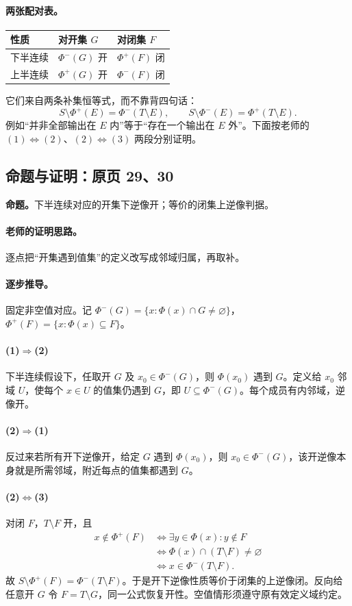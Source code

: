 \paragraph{两张配对表。}
\begin{center}\begin{tabular}{lll}\toprule
性质&对开集 $G$&对闭集 $F$\\\midrule
下半连续&$\Phi^-(G)$ 开&$\Phi^+(F)$ 闭\\
上半连续&$\Phi^+(G)$ 开&$\Phi^-(F)$ 闭\\\bottomrule\end{tabular}\end{center}
它们来自两条补集恒等式，而不靠背四句话：
\[S\setminus\Phi^+(E)=\Phi^-(T\setminus E),\qquad
S\setminus\Phi^-(E)=\Phi^+(T\setminus E).\]
例如“并非全部输出在 $E$ 内”等于“存在一个输出在 $E$ 外”。下面按老师的 $(1)\Leftrightarrow(2)$、$(2)\Leftrightarrow(3)$ 两段分别证明。


\subsection{命题与证明：原页 29、30}

\textbf{命题。}下半连续对应的开集下逆像开；等价的闭集上逆像判据。

\paragraph{老师的证明思路。}逐点把“开集遇到值集”的定义改写成邻域归属，再取补。

\paragraph{逐步推导。}
固定非空值对应。记 $\Phi^-(G)=\{x:\Phi(x)\cap G\ne\varnothing\}$，$\Phi^+(F)=\{x:\Phi(x)\subseteq F\}$。
\paragraph{(1)$\Rightarrow$(2)}下半连续假设下，任取开 $G$ 及 $x_0\in\Phi^-(G)$，则 $\Phi(x_0)$ 遇到 $G$。定义给 $x_0$ 邻域 $U$，使每个 $x\in U$ 的值集仍遇到 $G$，即 $U\subseteq\Phi^-(G)$。每个成员有内邻域，逆像开。
\paragraph{(2)$\Rightarrow$(1)}反过来若所有开下逆像开，给定 $G$ 遇到 $\Phi(x_0)$，则 $x_0\in\Phi^-(G)$，该开逆像本身就是所需邻域，附近每点的值集都遇到 $G$。
\paragraph{(2)$\Leftrightarrow$(3)}对闭 $F$，$T\setminus F$ 开，且
\begin{align*}
x\notin\Phi^+(F)&\iff\exists y\in\Phi(x):y\notin F\\
&\iff\Phi(x)\cap(T\setminus F)\ne\varnothing\\
&\iff x\in\Phi^-(T\setminus F).
\end{align*}
故 $S\setminus\Phi^+(F)=\Phi^-(T\setminus F)$。于是开下逆像性质等价于闭集的上逆像闭。反向给任意开 $G$ 令 $F=T\setminus G$，同一公式恢复开性。空值情形须遵守原有效定义域约定。


